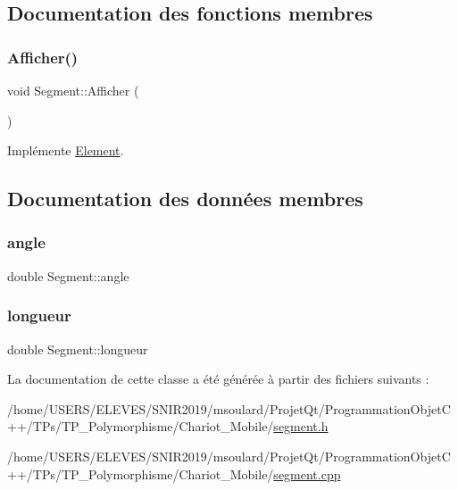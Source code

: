 \subsection{Documentation des fonctions membres}
\mbox{\label{class_segment_a1ec3ffd47a383755b4f0a51311a5c7d7}} 
\subsubsection{\texorpdfstring{Afficher()}{Afficher()}}
{\footnotesize\ttfamily void Segment\+::\+Afficher (\begin{DoxyParamCaption}{ }\end{DoxyParamCaption})\hspace{0.3cm}{\ttfamily [virtual]}}



Implémente \hyperlink{class_element_aa6fe26841512814e1e838c14c692daf0}{Element}.



\subsection{Documentation des données membres}
\mbox{\label{class_segment_a58f4b5a7f3c0a1038d10e778f3684b20}} 
\subsubsection{\texorpdfstring{angle}{angle}}
{\footnotesize\ttfamily double Segment\+::angle\hspace{0.3cm}{\ttfamily [private]}}

\mbox{\label{class_segment_a89584eea5e0b7c9d3fe5bcddf437f358}} 
\subsubsection{\texorpdfstring{longueur}{longueur}}
{\footnotesize\ttfamily double Segment\+::longueur\hspace{0.3cm}{\ttfamily [private]}}



La documentation de cette classe a été générée à partir des fichiers suivants \+:\begin{DoxyCompactItemize}
\item 
/home/\+U\+S\+E\+R\+S/\+E\+L\+E\+V\+E\+S/\+S\+N\+I\+R2019/msoulard/\+Projet\+Qt/\+Programmation\+Objet\+C++/\+T\+Ps/\+T\+P\+\_\+\+Polymorphisme/\+Chariot\+\_\+\+Mobile/\hyperlink{segment_8h}{segment.\+h}\item 
/home/\+U\+S\+E\+R\+S/\+E\+L\+E\+V\+E\+S/\+S\+N\+I\+R2019/msoulard/\+Projet\+Qt/\+Programmation\+Objet\+C++/\+T\+Ps/\+T\+P\+\_\+\+Polymorphisme/\+Chariot\+\_\+\+Mobile/\hyperlink{segment_8cpp}{segment.\+cpp}\end{DoxyCompactItemize}
